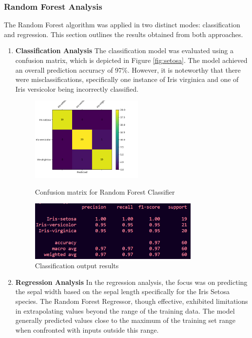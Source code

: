 \documentclass[a4paper]{article}
\begin{document}
\subsubsection{Random Forest Analysis}
The Random Forest algorithm was applied in two distinct modes: classification and regression. This section outlines the results obtained from both approaches.
\begin{enumerate}
\item \textbf{Classification Analysis}
The classification model was evaluated using a confusion matrix, which is depicted in Figure \ref{fig:setosa}. The model achieved an overall prediction accuracy of 97\%. However, it is noteworthy that there were misclassifications, specifically one instance of Iris virginica and one of Iris versicolor being incorrectly classified.

\begin{figure}[h]
	\begin{minipage}{0.32\textwidth}
		\centering
		\includegraphics[height=4.2cm]{picture/RF2} %
		\caption{Confusion matrix for Random Forest Classifier}
		\label{fig:setosa}
	\end{minipage}\hspace{3cm}
	\begin{minipage}{0.32\textwidth}
		\centering
		\includegraphics[height=3cm]{picture/RF3} %
		\caption{Classification output results}
		\label{fig:versicolour}
	\end{minipage}\hfill
\end{figure}
\item \textbf{Regression Analysis}
In the regression analysis, the focus was on predicting the sepal width based on the sepal length specifically for the Iris Setosa species. The Random Forest Regressor, though effective, exhibited limitations in extrapolating values beyond the range of the training data. The model generally predicted values close to the maximum of the training set range when confronted with inputs outside this range. 


\end{enumerate}
\end{document}

